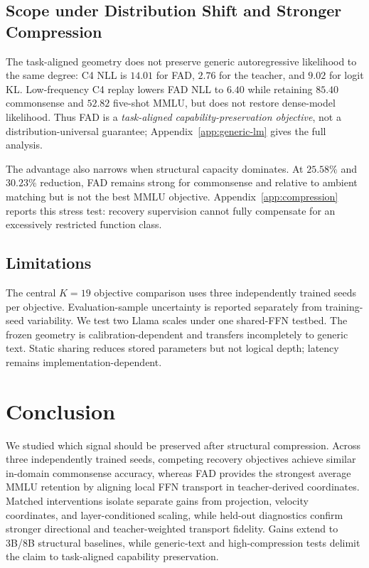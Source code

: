 \documentclass{article}
\theoremstyle{plain}
\theoremstyle{definition}
\theoremstyle{remark}
\begin{document}
\subsection{Scope under Distribution Shift and Stronger Compression}
\label{sec:scope-results}

The task-aligned geometry does not preserve generic autoregressive likelihood to
the same degree: C4 NLL is $14.01$ for FAD, $2.76$ for the teacher, and $9.02$ for
logit KL.  Low-frequency C4 replay lowers FAD NLL to $6.40$ while retaining
$85.40$ commonsense and $52.82$ five-shot MMLU, but does not restore dense-model
likelihood.  Thus FAD is a \emph{task-aligned capability-preservation objective},
not a distribution-universal guarantee; Appendix~\ref{app:generic-lm} gives the
full analysis.

The advantage also narrows when structural capacity dominates.  At $25.58\%$ and
$30.23\%$ reduction, FAD remains strong for commonsense and relative to ambient
matching but is not the best MMLU objective.  Appendix~\ref{app:compression}
reports this stress test: recovery supervision cannot fully compensate for an
excessively restricted function class.

\subsection{Limitations}
\label{sec:limitations}

The central $K=19$ objective comparison uses three independently trained seeds per objective.  Evaluation-sample uncertainty is reported separately from training-seed variability.
We test
two Llama scales under one shared-FFN testbed.  The frozen geometry is
calibration-dependent and transfers incompletely to generic text.  Static sharing
reduces stored parameters but not logical depth; latency remains
implementation-dependent.

\section{Conclusion}
\label{sec:conclusion}

We studied which signal should be preserved after structural compression.
Across three independently trained seeds, competing recovery objectives achieve
similar in-domain commonsense accuracy, whereas FAD provides the strongest
average MMLU retention by aligning local FFN transport in teacher-derived
coordinates. Matched interventions isolate separate gains from projection,
velocity coordinates, and layer-conditioned scaling, while held-out diagnostics
confirm stronger directional and teacher-weighted transport fidelity. Gains
extend to 3B/8B structural baselines, while generic-text and high-compression
tests delimit the claim to task-aligned capability preservation.
\end{document}
